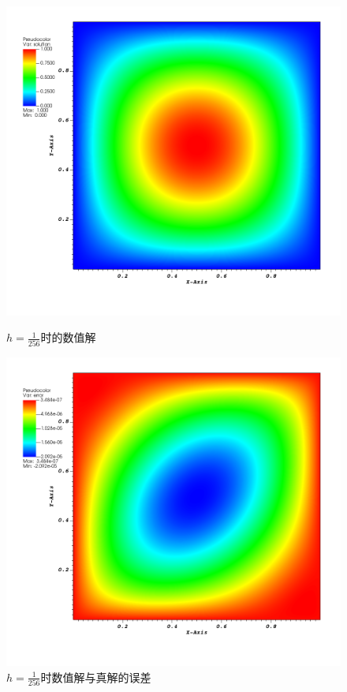 \documentclass[lang=cn,11pt,a4paper]{elegantpaper}
\begin{document}
\begin{figure}[H]
    \centering
    \begin{minipage}[t]{0.4\textwidth}
        \centering
        \includegraphics[width=\linewidth]{png/solution-2D.png}
        \caption{\small $h=\frac{1}{256}$时的数值解}
    \end{minipage}
    \hfill
    \begin{minipage}[t]{0.4\textwidth}
        \centering
        \includegraphics[width=\linewidth]{png/error-2D.png}
        \caption{\small $h=\frac{1}{256}$时数值解与真解的误差}
    \end{minipage}
\end{figure}
\end{document}

